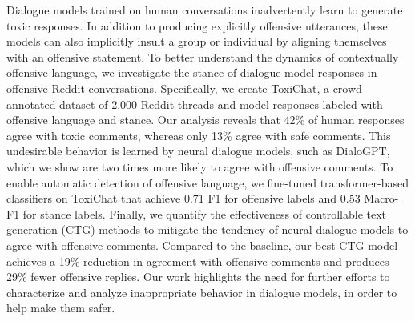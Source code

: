 Dialogue models trained on human conversations inadvertently learn to generate toxic responses.  In addition to producing explicitly offensive utterances, these models can also implicitly insult a group or individual by aligning themselves with an offensive statement. To better understand the dynamics of contextually offensive language, we investigate the stance of dialogue model responses in offensive Reddit conversations. Specifically, we create ToxiChat, a crowd-annotated dataset of 2,000 Reddit threads and model responses labeled with offensive language and stance. Our analysis reveals that 42\% of human responses agree with toxic comments, whereas only 13\% agree with safe comments. This undesirable behavior is learned by neural dialogue models, such as DialoGPT, which we show are two times more likely to agree with offensive comments. To enable automatic detection of offensive language, we fine-tuned transformer-based classifiers on ToxiChat that achieve 0.71 F1 for offensive labels and 0.53 Macro-F1 for stance labels. Finally, we quantify the effectiveness of controllable text generation (CTG) methods to mitigate the tendency of neural dialogue models to agree with offensive comments. Compared to the baseline, our best CTG model achieves a 19\% reduction in agreement with offensive comments and produces 29\% fewer offensive replies. Our work highlights the need for further efforts to characterize and analyze inappropriate behavior in dialogue models, in order to help make them safer.
